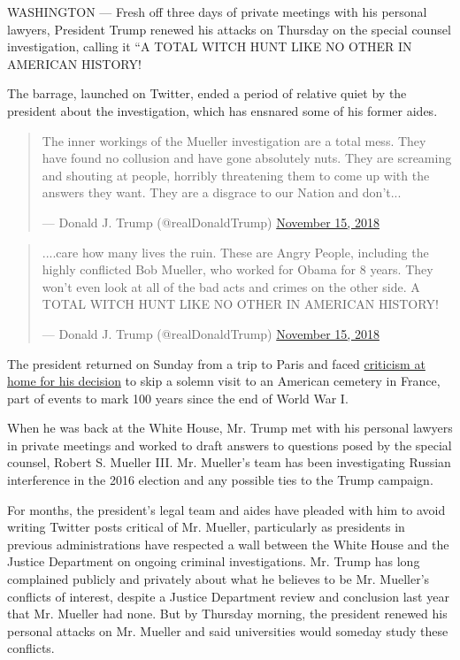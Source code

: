 WASHINGTON --- Fresh off three days of private meetings with his
personal lawyers, President Trump renewed his attacks on Thursday on the
special counsel investigation, calling it ``A TOTAL WITCH HUNT LIKE NO
OTHER IN AMERICAN HISTORY!

The barrage, launched on Twitter, ended a period of relative quiet by
the president about the investigation, which has ensnared some of his
former aides.

\begin{quote}
The inner workings of the Mueller investigation are a total mess. They
have found no collusion and have gone absolutely nuts. They are
screaming and shouting at people, horribly threatening them to come up
with the answers they want. They are a disgrace to our Nation and
don't...

--- Donald J. Trump (@realDonaldTrump)
\href{https://twitter.com/realDonaldTrump/status/1063042585802039296?ref_src=twsrc\%5Etfw}{November
15, 2018}
\end{quote}

\begin{quote}
....care how many lives the ruin. These are Angry People, including the
highly conflicted Bob Mueller, who worked for Obama for 8 years. They
won't even look at all of the bad acts and crimes on the other side. A
TOTAL WITCH HUNT LIKE NO OTHER IN AMERICAN HISTORY!

--- Donald J. Trump (@realDonaldTrump)
\href{https://twitter.com/realDonaldTrump/status/1063046973857718272?ref_src=twsrc\%5Etfw}{November
15, 2018}
\end{quote}

The president returned on Sunday from a trip to Paris and faced
\href{https://www.nytimes.com/2018/11/13/us/politics/trump-macron-france.html}{criticism
at home for his decision} to skip a solemn visit to an American cemetery
in France, part of events to mark 100 years since the end of World War
I.

When he was back at the White House, Mr. Trump met with his personal
lawyers in private meetings and worked to draft answers to questions
posed by the special counsel, Robert S. Mueller III. Mr. Mueller's team
has been investigating Russian interference in the 2016 election and any
possible ties to the Trump campaign.

For months, the president's legal team and aides have pleaded with him
to avoid writing Twitter posts critical of Mr. Mueller, particularly as
presidents in previous administrations have respected a wall between the
White House and the Justice Department on ongoing criminal
investigations. Mr. Trump has long complained publicly and privately
about what he believes to be Mr. Mueller's conflicts of interest,
despite a Justice Department review and conclusion last year that Mr.
Mueller had none. But by Thursday morning, the president renewed his
personal attacks on Mr. Mueller and said universities would someday
study these conflicts.

